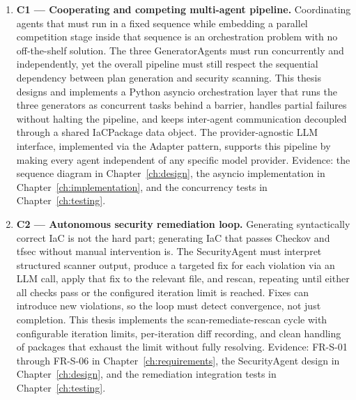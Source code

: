 \begin{enumerate}

  \item \textbf{C1 --- Cooperating and competing multi-agent pipeline.}
    Coordinating agents that must run in a fixed sequence while embedding
    a parallel competition stage inside that sequence is an orchestration
    problem with no off-the-shelf solution. The three GeneratorAgents must
    run concurrently and independently, yet the overall pipeline must still
    respect the sequential dependency between plan generation and security
    scanning. This thesis designs and implements a Python asyncio
    orchestration layer that runs the three generators as concurrent tasks
    behind a barrier, handles partial failures without halting the pipeline,
    and keeps inter-agent communication decoupled through a shared
    IaCPackage data object. The provider-agnostic LLM interface, implemented
    via the Adapter pattern, supports this pipeline by making every agent
    independent of any specific model provider.
    Evidence: the sequence diagram in Chapter~\ref{ch:design}, the asyncio
    implementation in Chapter~\ref{ch:implementation}, and the concurrency
    tests in Chapter~\ref{ch:testing}.

  \item \textbf{C2 --- Autonomous security remediation loop.}
    Generating syntactically correct IaC is not the hard part; generating
    IaC that passes Checkov and tfsec without manual intervention is. The
    SecurityAgent must interpret structured scanner output, produce a
    targeted fix for each violation via an LLM call, apply that fix to the
    relevant file, and rescan, repeating until either all checks pass or the
    configured iteration limit is reached. Fixes can introduce new
    violations, so the loop must detect convergence, not just completion.
    This thesis implements the scan-remediate-rescan cycle with configurable
    iteration limits, per-iteration diff recording, and clean handling of
    packages that exhaust the limit without fully resolving.
    Evidence: FR-S-01 through FR-S-06 in Chapter~\ref{ch:requirements},
    the SecurityAgent design in Chapter~\ref{ch:design}, and the
    remediation integration tests in Chapter~\ref{ch:testing}.


\end{enumerate}
